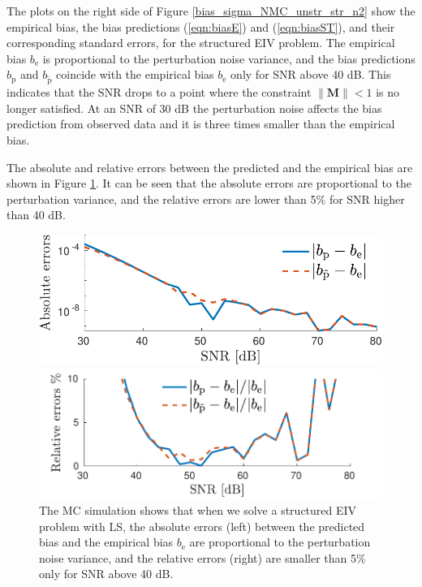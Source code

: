 The plots on the right side of Figure \ref{bias_sigma_NMC_unstr_str_n2} show the empirical bias, the bias predictions (\ref{eqn:biasE}) and (\ref{eqn:biasST}), and their corresponding standard errors, for the structured EIV problem.
The empirical bias $b_\mathrm{e}$ is proportional to the perturbation noise variance, and
the bias predictions $b_\mathrm{p}$ and $b_{\widetilde{\mathrm{p}}}$ coincide with the empirical bias $b_\mathrm{e}$ only for SNR above 40 dB.
This indicates that the SNR drops to a point where the constraint $\| \mathbf{M} \| < 1$ is no longer satisfied.
At an SNR of 30 dB the perturbation noise affects the bias prediction from observed data and it is three times smaller than the empirical bias.


The absolute and relative errors between the predicted and the empirical bias are shown in Figure \ref{fig:b_bt_abse_rele_str_e7}.
It can be seen that the absolute errors are proportional to the perturbation variance, and the relative errors are lower than 5\% for SNR higher than 40 dB. 

\begin{figure}[htb!]
    \centering
    \begin{minipage}{0.45\textwidth}
        \centering
        \includegraphics[width=1\textwidth]{./ChapterStatisticalAnalysis/fig/Fig_6l.pdf} 
    \end{minipage}
    \begin{minipage}{0.45\textwidth}
        \centering
        \includegraphics[width=1\textwidth]{./ChapterStatisticalAnalysis/fig/Fig_6r.pdf} 
    \end{minipage}
  \caption{ \label{fig:b_bt_abse_rele_str_e7} The MC simulation shows that when we solve a structured EIV problem with LS, the absolute errors (left) between the predicted bias and the empirical bias $b_{\mathrm{e}}$ are proportional to the perturbation noise variance, and the relative errors (right) are smaller than 5\% only for SNR above 40 dB.}
\end{figure}


